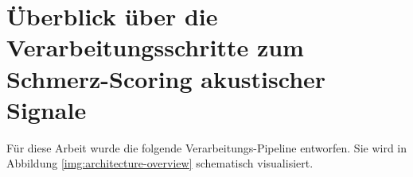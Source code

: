 \section{Überblick über die Verarbeitungsschritte zum Schmerz-Scoring akustischer Signale}
\label{sec:pipeline}


Für diese Arbeit wurde die folgende Verarbeitungs-Pipeline entworfen. Sie wird in Abbildung \ref{img:architecture-overview} schematisch visualisiert. 
\vspace{4mm}

